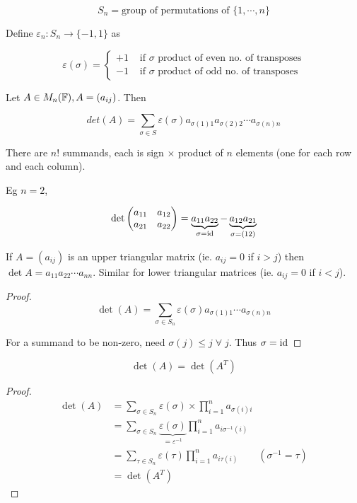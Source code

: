 \documentclass[a4paper]{article}
\begin{document}
\[ S_{n} = \text{group of permutations of } \{ 1,\cdots,n \} \]

Define $ \varepsilon_{n} : S_{n} \to \{ -1,1 \} $ as

\[ \varepsilon(\sigma) = \begin{cases} +1  & \text{ if } \sigma \text{ product of even no. of transposes} \\-1  & \text{ if } \sigma \text{ product of odd no. of transposes}\end{cases} \] 

\begin{defi}
	Let $ A \in M_{n}(\mathbb{F}), A = (a_{ij})$. Then
	
	\[ det(A) = \sum_{\sigma \in S} \varepsilon(\sigma) a_{\sigma(1)1}a_{\sigma(2)2}\cdots a_{\sigma(n)n} \]
\end{defi}

There are $ n! $ summands, each is sign $ \times $ product of $ n $ elements (one for each row and each column).

Eg $ n = 2 $,

\[ \det \begin{pmatrix}
a_{11} & a_{12} \\
a_{21} & a_{22}
\end{pmatrix} = \underbrace{a_{11}a_{22}}_{\sigma = \operatorname{id} } - \underbrace{a_{12}a_{21}}_{\sigma = (1 2)}  \]


\begin{lemma} 
	If $ A = (a_{ij}) $ is an upper triangular matrix (ie. $ a_{ij} = 0  $ if $ i > j $) then $ \det A = a_{11}a_{22}\cdots a_{nn} $. Similar for lower triangular matrices (ie. $ a_{ij} = 0 $ if $ i < j $).
\end{lemma}


\begin{proof}
	\[ \det(A) = \sum_{\sigma \in S_{n}}  \varepsilon(\sigma)a_{\sigma(1)1}\cdots a_{\sigma(n)n}  \]
	
	For a summand to be non-zero, need $ \sigma(j) \leq j \; \forall \; j $. Thus $ \sigma = \operatorname{id} $
\end{proof}

\begin{lemma} 
	\[ \det(A) = \det(A^{T}) \]
\end{lemma}
\begin{proof}
	\begin{align*}
	\det(A)  & = \sum_{\sigma \in S_{n}}  \varepsilon(\sigma) \times \prod_{i=1}^{n} a_{\sigma(i)i}   \\
	& = \sum_{\sigma \in S_{n}} \underbrace{\varepsilon(\sigma)}_{= \varepsilon^{-1}} \prod_{i=1}^{n} a_{i \sigma^{-1}(i)} \\
	& = \sum_{\tau \in S_{n}} \varepsilon(\tau) \prod_{i=1}^{n}a_{i \tau(i)} \qquad (\sigma^{-1} = \tau)\\
	& = \det (A^{T})
	\end{align*}
\end{proof}
\end{document}
